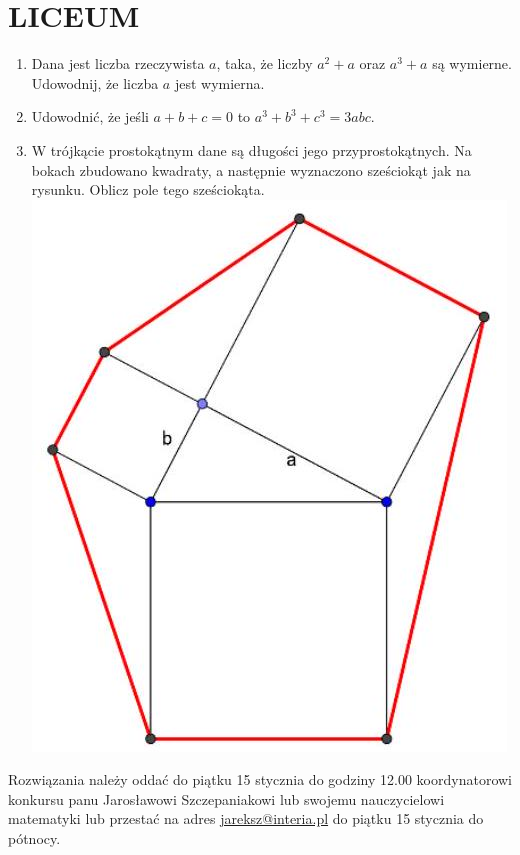 \documentclass[10pt]{article}
\begin{document}
\section*{LICEUM}
\begin{enumerate}
  \item Dana jest liczba rzeczywista \(a\), taka, że liczby \(a^{2}+a\) oraz \(a^{3}+a\) są wymierne. Udowodnij, że liczba \(a\) jest wymierna.
  \item Udowodnić, że jeśli \(a+b+c=0\) to \(a^{3}+b^{3}+c^{3}=3 a b c\).
  \item W trójkącie prostokątnym dane są długości jego przyprostokątnych. Na bokach zbudowano kwadraty, a następnie wyznaczono sześciokąt jak na rysunku. Oblicz pole tego sześciokąta.\\
\includegraphics[max width=\textwidth, center]{2024_11_21_e8106a0b3aefeaed866dg-1(1)}
\end{enumerate}

Rozwiązania należy oddać do piątku 15 stycznia do godziny 12.00 koordynatorowi konkursu panu Jarosławowi Szczepaniakowi lub swojemu nauczycielowi matematyki lub przestać na adres \href{mailto:jareksz@interia.pl}{jareksz@interia.pl} do piątku 15 stycznia do pótnocy.
\end{document}
